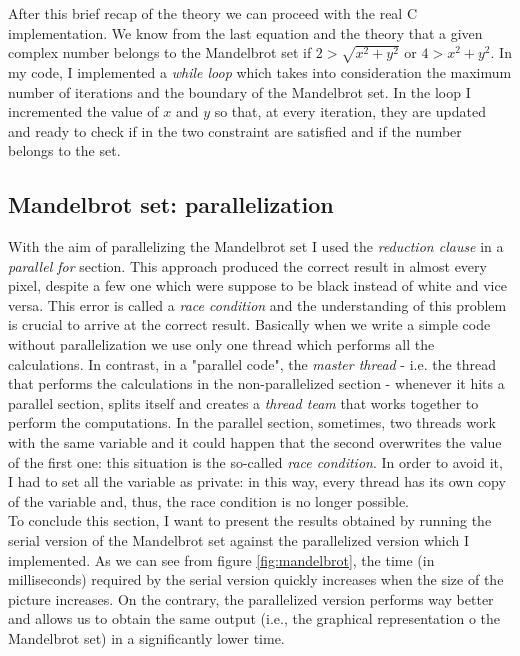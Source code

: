 \documentclass[unicode,11pt,a4paper,oneside,numbers=endperiod,openany]{scrartcl}
\begin{document}
After this brief recap of the theory we can proceed with the real C implementation. We know from the last equation and the theory that a given complex number belongs to the Mandelbrot set if $2 > \sqrt{x^2 + y^2}$ or $4 > x^2 + y^2$. In my code, I implemented a \textit{while loop} which takes into consideration the maximum number of iterations and the boundary of the Mandelbrot set. In the loop I incremented the value of $x$ and $y$ so that, at every iteration, they are updated and ready to check if in the two constraint are satisfied and if the number belongs to the set. \\




\subsection{Mandelbrot set: parallelization}
With the aim of parallelizing the Mandelbrot set I used the \textit{reduction clause} in a \textit{parallel for} section. This approach produced the correct result in almost every pixel, despite a few one which were suppose to be black instead of white and vice versa. This error is called a \textit{race condition} and the understanding of this problem is crucial to arrive at the correct result. Basically when we write a simple code without parallelization we use only one thread which performs all the calculations. In contrast, in a "parallel code", the \textit{master thread} - i.e. the thread that performs the calculations in the non-parallelized section - whenever it hits a parallel section, splits itself and creates a \textit{thread team} that works together to perform the computations. In the parallel section, sometimes, two threads work with the same variable and it could happen that the second overwrites the value of the first one: this situation is the so-called \textit{race condition}. In order to avoid it, I had to set all the variable as private: in this way, every thread has its own copy of the variable and, thus, the race condition is no longer possible. \\




To conclude this section, I want to present the results obtained by running the serial version of the Mandelbrot set against the parallelized version which I implemented. As we can see from figure \ref{fig:mandelbrot}, the time (in milliseconds) required by the serial version quickly increases when the size of the picture increases. On the contrary, the parallelized version performs way better and allows us to obtain the same output (i.e., the graphical representation o the Mandelbrot set) in a significantly lower time.
\end{document}

